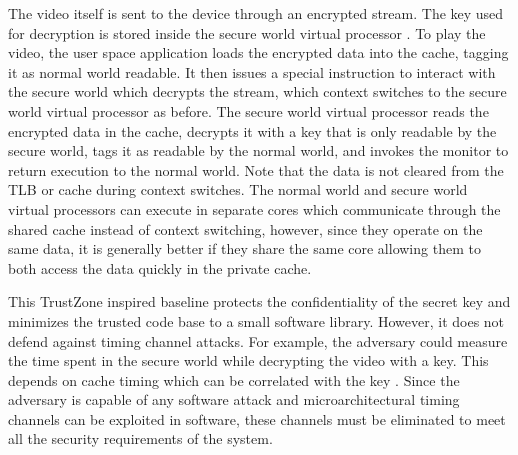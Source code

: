     The video itself is sent to the device through an encrypted stream. The key 
    used for decryption is stored inside the secure world virtual processor .  
    To play the video, the user space application loads the encrypted data into 
    the cache, tagging it as normal world readable. It then issues a special 
    instruction to interact with the secure world which decrypts the stream, 
    which context switches to the secure world virtual processor as before. The 
    secure world virtual processor
    reads the encrypted data in the cache, decrypts it with a key that is only 
    readable by the secure world, tags it as readable by the normal world, and 
    invokes the monitor to return execution to the normal world. Note that the 
    data is not cleared from the TLB or cache during context switches.  The 
    normal world and secure world virtual processors can execute in separate 
    cores which communicate through the shared cache instead of context 
    switching, however, since they operate on the same data, it is generally 
    better if they share the same core allowing them to both access the data 
    quickly in the private cache. 

    This TrustZone inspired baseline protects the confidentiality of the secret 
    key and minimizes the trusted code base to a small software library.  
    However, it does not defend against timing channel attacks.
    For example, the adversary could measure the time spent in the secure world 
    while decrypting the video with a key. This depends on cache timing which 
    can be correlated with the key \cite{bernstein,others}.
    Since the adversary is capable of any software attack and 
    microarchitectural timing channels can be exploited in software, these 
    channels must be eliminated to meet all the security requirements of the 
    system.
